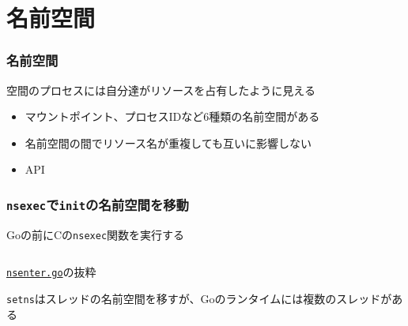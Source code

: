 \documentclass[unicode, 14pt, aspectratio=169]{beamer}
\begin{document}
\section{名前空間}
\begin{frame}
  \frametitle{名前空間\supercite{namespaces}}
  空間のプロセスには自分達がリソースを占有したように見える
  \begin{itemize}[leftmargin=0.8cm,label=$\circ$]
    \item マウントポイント、プロセスIDなど6種類の名前空間がある
    \item 名前空間の間でリソース名が重複しても互いに影響しない
    \item API
    \end{itemize}
\end{frame}
\begin{frame}
  \frametitle{\texttt{nsexec}で\texttt{init}の名前空間を移動}
  Goの前にCの\texttt{nsexec}関数を実行する
  \begin{center}
    \inputminted{go}{code/nsenter.go}
    \href{https://github.com/opencontainers/runc/blob/7cb363254b69e10320360b63fb73e0ffb5da7bf2/libcontainer/nsenter/nsenter.go\#L12}{\texttt{nsenter.go}}の抜粋
  \end{center}
  \texttt{setns}はスレッドの名前空間を移すが、Goのランタイムには複数のスレッドがある
\end{frame}
\end{document}
